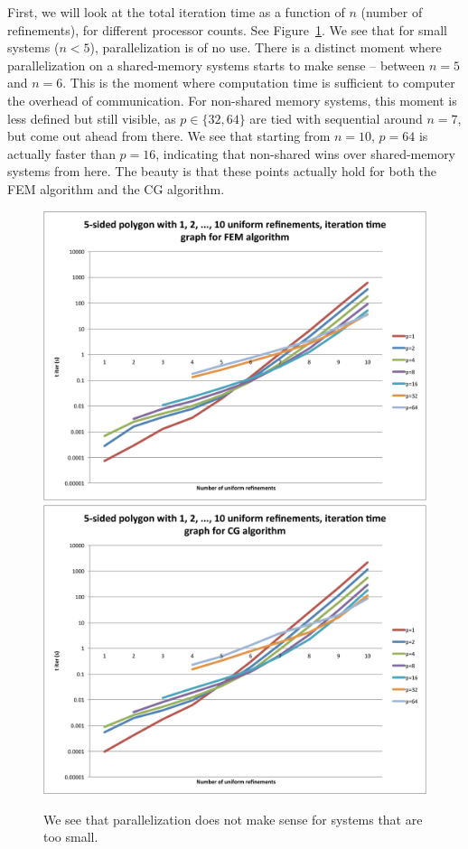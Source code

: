 \documentclass[11pt]{amsart}
\theoremstyle{definition}
\begin{document}
First, we will look at the total iteration time as a function of $n$ (number of refinements), for different processor counts. See Figure~\ref{fig:times}. We see that for small systems ($n < 5$), parallelization is of no use. There is a distinct moment where parallelization on a shared-memory systems starts to make sense -- between $n=5$ and $n=6$. This is the moment where computation time is sufficient to computer the overhead of communication. For non-shared memory systems, this moment is less defined but still visible, as $p \in \{32,64\}$ are tied with sequential around $n=7$, but come out ahead from there. We see that starting from $n=10$, $p=64$ is actually faster than $p=16$, indicating that non-shared wins over shared-memory systems from here. The beauty is that these points actually hold for both the FEM algorithm and the CG algorithm.
\begin{figure}
  \includegraphics[width=0.8\linewidth]{times_fem.pdf}
  \includegraphics[width=0.8\linewidth]{times_cg.pdf}
  \caption{We see that parallelization does not make sense for systems that are too small.}
  \label{fig:times}
\end{figure}
\end{document}
